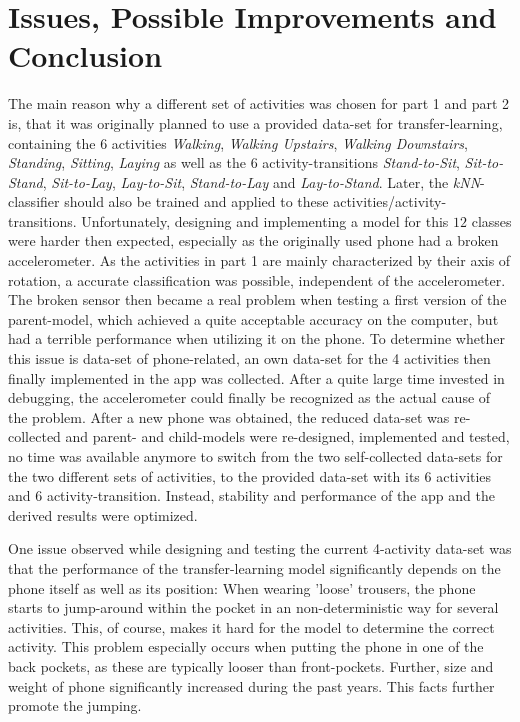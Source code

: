 \documentclass[journal]{IEEEtran}
\begin{document}
\section{Issues, Possible Improvements and Conclusion}
\label{sec:conclusion}
The main reason why a different set of activities was chosen for part 1 and part
2 is, that it was originally planned to use a provided data-set for
transfer-learning, containing the 6 activities \textit{Walking}, \textit{Walking
Upstairs}, \textit{Walking Downstairs}, \textit{Standing}, \textit{Sitting},
\textit{Laying} as well as the 6 activity-transitions \textit{Stand-to-Sit},
\textit{Sit-to-Stand}, \textit{Sit-to-Lay}, \textit{Lay-to-Sit},
\textit{Stand-to-Lay} and \textit{Lay-to-Stand}. Later, the
\textit{kNN}-classifier should also be trained and applied to these
activities/activity-transitions. Unfortunately, designing and
implementing a model for this $12$ classes were harder then expected, especially
as the originally used phone had a broken accelerometer. As the activities in
part 1 are mainly characterized by their axis of rotation, a accurate
classification was possible, independent of the accelerometer. The broken
sensor then became a real problem when testing a first version of the
parent-model, which achieved a quite acceptable accuracy on the computer, but
had a terrible performance when utilizing it on the phone. \newline
To determine whether this issue is data-set of phone-related, an own data-set for
the 4 activities then finally implemented in the app was collected. After a
quite large time invested in debugging, the accelerometer could finally be recognized
as the actual cause of the problem. \newline
After a new phone was obtained, the reduced data-set was re-collected and
parent- and child-models were re-designed, implemented and tested, no time was
available anymore to switch from the two self-collected data-sets for the two
different sets of activities, to the provided data-set with its 6 activities and
6 activity-transition. Instead, stability and performance of the app and the
derived results were optimized.\newline

One issue observed while designing and testing the current 4-activity data-set
was that the performance of the transfer-learning model significantly depends
on the phone itself as well as its position: When wearing 'loose' trousers, 
the phone starts to jump-around within the pocket in an non-deterministic way 
for several activities. This, of course, makes it hard for the model to 
determine the correct activity. 
This problem especially occurs when putting the phone in one of the back pockets, 
as these are typically looser than front-pockets. 
Further, size and weight of phone significantly increased during the past years.
This facts further promote the jumping.\newline
\end{document}
